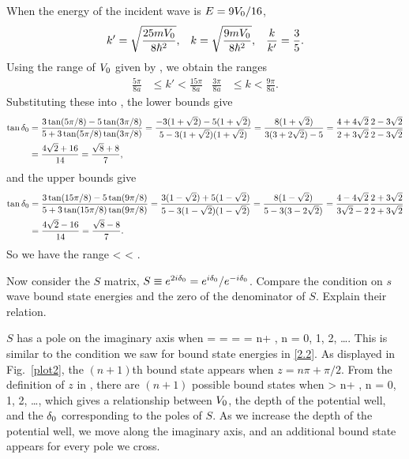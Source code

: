 \begin{solution}
	When the energy of the incident wave is $E = 9 V_0 / 16$,
	\begin{align*}
		k' &= \sqrt{\frac{25 m V_0}{8 \hbar^2}}, &
		k &= \sqrt{\frac{9 m V_0}{8 \hbar^2}}, &
		\frac{k}{k'} = \frac{3}{5}.
	\end{align*}
	Using the range of $V_0$ given by , we obtain the ranges
	\begin{align*}
		\frac{5 \pi}{8 a} &\leq k' < \frac{15 \pi}{8 a} &
		\frac{3 \pi}{8 a} &\leq k < \frac{9 \pi}{8 a}.
	\end{align*}
	Substituting these into , the lower bounds give
	\begin{align*}
		\tan\delta_0 &= \frac{3 \tan(5 \pi / 8) - 5 \tan(3\pi / 8)}{5 + 3 \tan(5 \pi / 8) \tan(3\pi / 8)}
		= \frac{-3 (1 + \sqrt{2}) - 5 (1 + \sqrt{2})}{5 - 3 (1 + \sqrt{2}) (1 + \sqrt{2})}
		= \frac{8 (1 + \sqrt{2})}{3(3 + 2 \sqrt{2}) - 5}
		= \frac{4 + 4 \sqrt{2}}{2 + 3 \sqrt{2}} \frac{2 - 3 \sqrt{2}}{2 - 3 \sqrt{2}} \\
		&= \frac{4 \sqrt{2} + 16}{14}
		= \frac{\sqrt{8} + 8}{7},
	\end{align*}
	and the upper bounds give
	\begin{align*}
		\tan\delta_0 &= \frac{3 \tan(15 \pi / 8) - 5 \tan(9\pi / 8)}{5 + 3 \tan(15 \pi / 8) \tan(9\pi / 8)}
		= \frac{3 (1 - \sqrt{2}) + 5 (1 - \sqrt{2})}{5 - 3 (1 - \sqrt{2}) (1 - \sqrt{2})}
		= \frac{8 (1 - \sqrt{2})}{5 - 3 (3 - 2 \sqrt{2})}
		= \frac{4 - 4 \sqrt{2}}{3 \sqrt{2} - 2} \frac{2 + 3 \sqrt{2}}{2 + 3 \sqrt{2}} \\
		&= \frac{4 \sqrt{2} - 16}{14}
		= \frac{\sqrt{8} - 8}{7}.
	\end{align*}
	So we have the range
	\beq
		 < \tan\delo < .
	\eeq
	\vfix
\end{solution}



\begin{problem}
	Now consider the $S$ matrix, $S \equiv e^{2i \delta_0} = e^{i \delta_0} / e^{-i \delta_0}$.  Compare the condition on $s$ wave bound state energies and the zero of the denominator of $S$.  Explain their relation.
\end{problem}

\begin{solution}
	$S$ has a pole on the imaginary axis when
	 = \Re[e^{-i \delo}] =  = \cos\delo
		\qimplies
		\delo = n\pi + , \quad n = 0, 1, 2, \ldots.
	\eeq
	This is similar to the condition we saw for bound state energies in \ref{2.2}.  As displayed in Fig.~\ref{plot2}, the $(n + 1)$th bound state appears when $z = n\pi + \pi / 2$.  From the definition of $z$ in , there are $(n + 1)$ possible bound states when
	\beq
		 > n\pi + , \quad n = 0, 1, 2, \ldots,
	\eeq
	which gives a relationship between $V_0$, the depth of the potential well, and the $\delta_0$ corresponding to the poles of $S$.  As we increase the depth of the potential well, we move along the imaginary axis, and an additional bound state appears for every pole we cross.
\end{solution}

